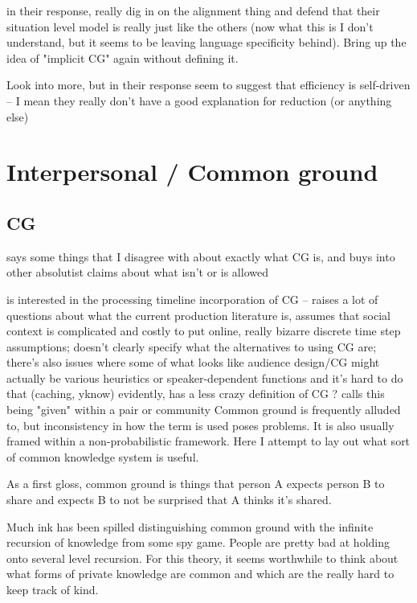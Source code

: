 \documentclass[]{article}
\begin{document}
in their response, \cite{pickering2004} really dig in on the alignment thing and defend that their situation level model is really just like the others (now what this is I don't understand, but it seems to be leaving language specificity behind). Bring up the idea of "implicit CG" again without defining it. 

Look into more, but \cite{pickering2004} in their response seem to suggest that efficiency is self-driven -- I mean they really don't have a good explanation for reduction (or anything else) 


\section{Interpersonal / Common ground}
\subsection{CG}

\cite{horton1996} says some things that I disagree with about exactly what CG is, and buys into other absolutist claims about what isn't or is allowed

\cite{horton1996} is interested in the processing timeline incorporation of CG -- raises a lot of questions about what the current production literature is, assumes that social context is complicated and costly to put online, really bizarre discrete time step assumptions; doesn't clearly specify what the alternatives to using CG are; there's also issues where some of what looks like audience design/CG might actually be various heuristics or speaker-dependent functions and it's hard to do that (caching, yknow) 
evidently, \cite{hanna2003} has a less crazy definition of CG ? 
\cite{fay2010} calls this being "given" within a pair or community 
Common ground is frequently alluded to, but inconsistency in how the term is used poses problems. It is also usually framed within a non-probabilistic framework. Here I attempt to lay out what sort of common knowledge system is useful. 

As a first gloss, common ground is things that person A expects person B to share and expects B to not be surprised that A thinks it's shared. 

Much ink has been spilled distinguishing common ground with the infinite recursion of knowledge from some spy game. People are pretty bad at holding onto several level recursion. For this theory, it seems worthwhile to think about what forms of private knowledge are common and which are the really hard to keep track of kind. 
\end{document}
